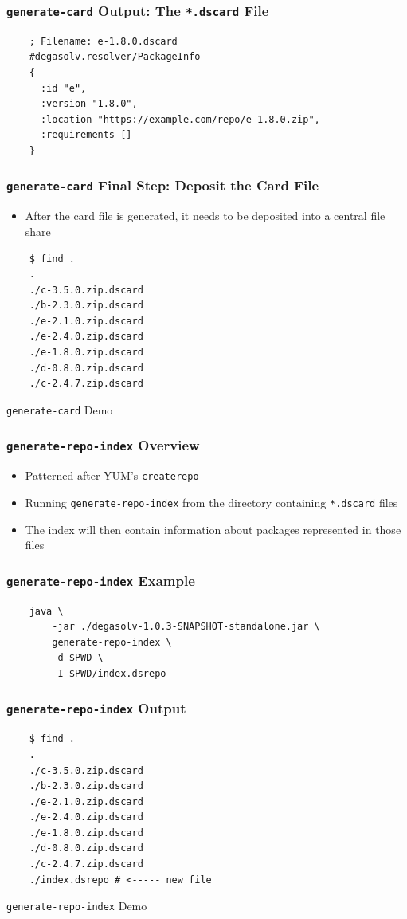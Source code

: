 \documentclass{beamer}
\begin{document}
\begin{frame}[fragile]
  \frametitle{\texttt{generate-card} Output: The \texttt{*.dscard} File}
\begin{verbatim}
    ; Filename: e-1.8.0.dscard
    #degasolv.resolver/PackageInfo
    {
      :id "e",
      :version "1.8.0",
      :location "https://example.com/repo/e-1.8.0.zip",
      :requirements []
    }
\end{verbatim}
\end{frame}
\begin{frame}[fragile]
  \frametitle{\texttt{generate-card} Final Step: Deposit the Card File}
  \begin{itemize}
  \item After the card file is generated, it needs to be deposited into a
    central file share
  \end{itemize}
\begin{verbatim}
    $ find .
    .
    ./c-3.5.0.zip.dscard
    ./b-2.3.0.zip.dscard
    ./e-2.1.0.zip.dscard
    ./e-2.4.0.zip.dscard
    ./e-1.8.0.zip.dscard
    ./d-0.8.0.zip.dscard
    ./c-2.4.7.zip.dscard
\end{verbatim}
\end{frame}
\begin{frame}
  \centerline{\color{blue}\Large \texttt{generate-card} Demo}
\end{frame}
\begin{frame}
  \frametitle{\texttt{generate-repo-index} Overview}
  \begin{itemize}
  \item Patterned after YUM's \texttt{createrepo}
  \item Running \texttt{generate-repo-index} from the directory containing \texttt{*.dscard}
    files
  \item The index will then contain information about packages represented in those
    files
  \end{itemize}
\end{frame}
\begin{frame}[fragile]
  \frametitle{\texttt{generate-repo-index} Example}
\begin{verbatim}
    java \
        -jar ./degasolv-1.0.3-SNAPSHOT-standalone.jar \
        generate-repo-index \
        -d $PWD \
        -I $PWD/index.dsrepo
\end{verbatim}
\end{frame}
\begin{frame}[fragile]
  \frametitle{\texttt{generate-repo-index} Output}
\begin{verbatim}
    $ find .
    .
    ./c-3.5.0.zip.dscard
    ./b-2.3.0.zip.dscard
    ./e-2.1.0.zip.dscard
    ./e-2.4.0.zip.dscard
    ./e-1.8.0.zip.dscard
    ./d-0.8.0.zip.dscard
    ./c-2.4.7.zip.dscard
    ./index.dsrepo # <----- new file
\end{verbatim}
\end{frame}
\begin{frame}
  \centerline{\color{blue}\Large \texttt{generate-repo-index} Demo}
\end{frame}
\end{document}
